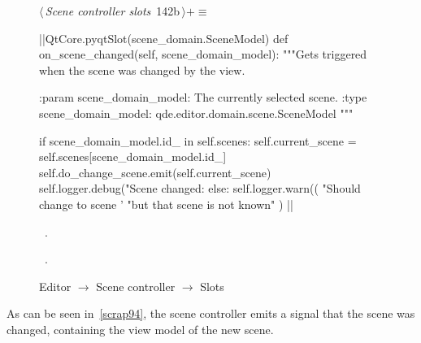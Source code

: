 \documentclass[%
    a4paper,    %
    justified,  %
    nobib,      %
    openany     %
]{tufte-book}
\makeatletter
\renewcommand{\label}[1]{\@tufte@label{##1}}%
\makeatother
\begin{document}
\begin{figure}[!htbp]
\begin{flushleft} \small
\begin{minipage}{\linewidth}\label{scrap94}\raggedright\small
{} $\langle\,${\itshape Scene controller slots}\nobreak\ {\footnotesize {142b}}$\,\rangle+\equiv$
\vspace{-1ex}
\begin{pythoncode}
|\normalfont{}\fontfamily{}|QtCore.pyqtSlot(scene_domain.SceneModel)
def on_scene_changed(self, scene_domain_model):
    """Gets triggered when the scene was changed by the view.

    :param scene_domain_model: The currently selected scene.
    :type  scene_domain_model: qde.editor.domain.scene.SceneModel
    """

    if scene_domain_model.id_ in self.scenes:
        self.current_scene = self.scenes[scene_domain_model.id_]
        self.do_change_scene.emit(self.current_scene)
        self.logger.debug("Scene changed: %
    else:
        self.logger.warn((
            "Should change to scene '%
            "but that scene is not known"
        ) %
|\NWsep|
\end{pythoncode}
\vspace{1.5ex}
\footnotesize
\begin{list}{}{\setlength{\itemsep}{-\parsep}\setlength{\itemindent}{-\leftmargin}}
\item \NWtxtMacroDefBy\ .
\item \NWtxtMacroRefIn\ .

\item{}
\end{list}
\end{minipage}\vspace{4ex}
\end{flushleft}
\caption{
  \newline{}\newline{}Editor $\rightarrow$ Scene controller $\rightarrow$
  Slots}
\end{figure}

As can be seen in~\cref{scrap94},
the scene controller emits a signal that the scene was changed, containing the
view model of the new scene.
\end{document}
